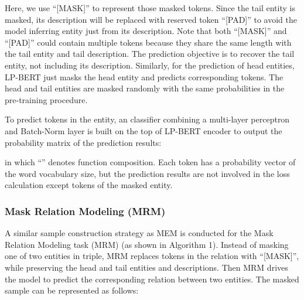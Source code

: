 \documentclass[journal]{IEEEtran}
\begin{document}
Here, we use ``[MASK]'' to represent those masked tokens. Since the tail entity is masked, its description will be replaced with reserved token ``[PAD]'' to avoid the model inferring entity just from its description. Note that both ``[MASK]'' and ``[PAD]'' could contain multiple tokens because they share the same length with the tail entity and tail description. The prediction objective is to recover the tail entity, not including its description. Similarly, for the prediction of head entities, LP-BERT just masks the head entity and predicts corresponding tokens. The head and tail entities are masked randomly with the same probabilities in the pre-training procedure.

To predict tokens in the entity, an classifier combining a multi-layer perceptron and Batch-Norm layer is built on the top of LP-BERT encoder to  output the probability matrix of the prediction results:

in which ``'' denotes function composition. Each token has a probability vector of the word vocabulary size, but the prediction results are not involved in the loss calculation except tokens of the masked entity. 
 
 \subsubsection{Mask Relation Modeling (MRM)}

A similar sample construction strategy as MEM is conducted for the Mask Relation Modeling task (MRM) (as shown in Algorithm 1). Instead of masking one of two entities in triple, MRM replaces tokens in the relation with ``[MASK]'', while preserving the head and tail entities and descriptions. Then MRM drives the model to predict the corresponding relation between two entities. The masked sample can be represented as follows:
\end{document}
